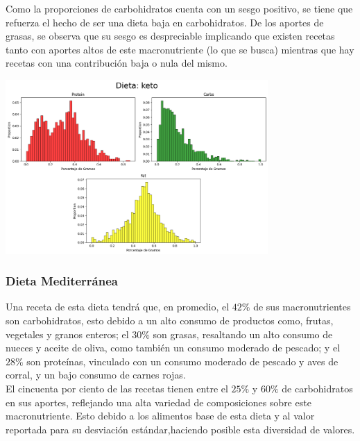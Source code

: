 \documentclass[12pt,a4paper]{article}
\begin{document}
        Como la proporciones de carbohidratos cuenta con un sesgo positivo, se 
        tiene que refuerza el hecho de ser una dieta baja en carbohidratos. 
        De los aportes de grasas, se observa que su sesgo es despreciable implicando 
        que existen recetas tanto con aportes altos de este macronutriente (lo que se 
        busca) mientras que hay recetas con una contribución baja o nula del mismo.
        \begin{center}
            \includegraphics[width=0.75\textwidth]{Resources/2_03_plot_02.png}
        \end{center}

    \subsubsection{Dieta Mediterránea}
        Una receta de esta dieta tendrá que, en promedio, el $42\%$ de sus 
        macronutrientes son carbohidratos, esto debido a un alto consumo de 
        productos como, frutas, vegetales y granos enteros; el $30\%$ son 
        grasas, resaltando un alto consumo de nueces y aceite de oliva, como 
        también un consumo moderado de pescado; y el $28\%$ son proteínas, 
        vinculado con un consumo moderado de pescado y aves de corral, y un 
        bajo consumo de carnes rojas.\\

        El cincuenta por ciento de las recetas tienen entre el $25\%$ y $60\%$ 
        de carbohidratos en sus aportes, reflejando una alta variedad de composiciones 
        sobre este macronutriente. Esto debido a los alimentos base de esta dieta y 
        al valor reportada para su desviación estándar,haciendo posible esta 
        diversidad de valores.\\
\end{document}

